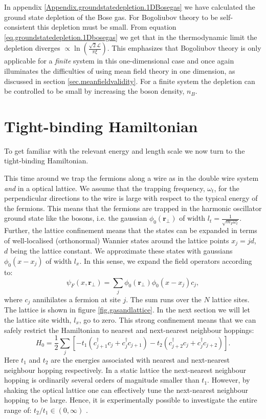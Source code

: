 In appendix \ref{Appendix.groundstatedepletion.1DBosegas} we have calculated the ground state depletion of the Bose gas. For Bogoliubov theory to be self-consistent this depletion must be small. From equation \eqref{eq.groundstatedepletion.1Dbosegas} we get that in the thermodynamic limit the depletion diverges $\propto \ln\left(\frac{\sqrt{2}\mathcal{L}}{\pi\xi} \right)$. This emphasizes that Bogoliubov theory is only applicable for a \textit{finite} system in this one-dimensional case and once again illuminates the difficulties of using mean field theory in one dimension, as discussed in section \ref{sec.meanfieldvalidity}. For a finite system the depletion can be controlled to be small by increasing the boson density, $n_B$. 

\section{Tight-binding Hamiltonian} \label{sec.TightbindingHam.lattice}
To get familiar with the relevant energy and length scale we now turn to the tight-binding Hamiltonian.

This time around we trap the fermions along a wire as in the double wire system \textit{and} in a optical lattice. We assume that the trapping frequency, $\omega_t$, for the perpendicular directions to the wire is large with respect to the typical energy of the fermions. This means that the fermions are trapped in the harmonic oscillator ground state like the bosons, i.e. the gaussian $\phi_0(\mathbf{r}_{\perp})$ of width $l_t = \frac{1}{\sqrt{m_F\omega_t}}$. Further, the lattice confinement means that the states can be expanded in terms of well-localised (orthonormal) Wannier states around the lattice points $x_j = jd$, $d$ being the lattice constant. We approximate these states with gaussians $\phi_0(x - x_j)$ of width $l_x$. In this sense, we expand the field operators according to:
\begin{equation}
\psi_F(x, \mathbf{r}_{\perp}) = \sum_j \phi_0(\mathbf{r}_{\perp})\phi_0(x - x_j) c_j, 
\label{eq.fieldexpansionlattice}
\end{equation}
where $c_j$ annihilates a fermion at site $j$. The sum runs over the $N$ lattice sites. The lattice is shown in figure \ref{fig.gasandlattice}. In the next section we will let the lattice site width, $l_x$, go to zero. This strong confinement means that we can safely restrict the Hamiltonian to nearest and next-nearest neighbour hoppings:
\begin{equation}
H_{0} = \frac{1}{2}\sum_{j} \left[- t_1(c^\dagger_{j+1}c_j + c^\dagger_j c_{j + 1}) - t_2(c^\dagger_{j + 2}c_j + c^\dagger_j c_{j + 2}) \right].
\label{eq.Htightbindingrealspace} 
\end{equation}
Here $t_1$ and $t_2$ are the energies associated with nearest and next-nearest neighbour hopping respectively. In a static lattice the next-nearest neighbour hopping is ordinarily several orders of magnitude smaller than $t_1$. However, by shaking the optical lattice one can effectively tune the next-nearest neighbour hopping to be large.
Hence, it is experimentally possible to investigate the entire range of: $t_2 / t_1 \in (0, \infty)$ \cite{Liberto.ShakingOpticalLattice}. 

